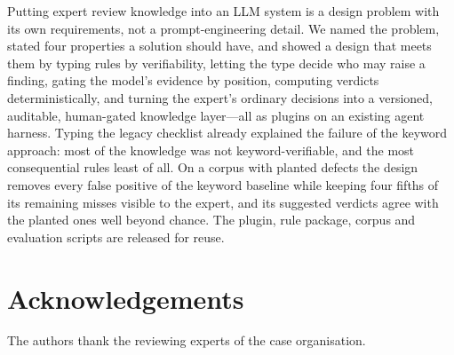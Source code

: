 \documentclass{IOS-Book-Article}
\begin{document}
Putting expert review knowledge into an LLM system is a design problem with its own requirements, not a prompt-engineering detail. We named the problem, stated four properties a solution should have, and showed a design that meets them by typing rules by verifiability, letting the type decide who may raise a finding, gating the model's evidence by position, computing verdicts deterministically, and turning the expert's ordinary decisions into a versioned, auditable, human-gated knowledge layer---all as plugins on an existing agent harness. Typing the legacy checklist already explained the failure of the keyword approach: most of the knowledge was not keyword-verifiable, and the most consequential rules least of all. On a corpus with planted defects the design removes every false positive of the keyword baseline while keeping four fifths of its remaining misses visible to the expert, and its suggested verdicts agree with the planted ones well beyond chance. The plugin, rule package, corpus and evaluation scripts are released for reuse.

\section*{Acknowledgements}

The authors thank the reviewing experts of the case organisation. %
\end{document}
